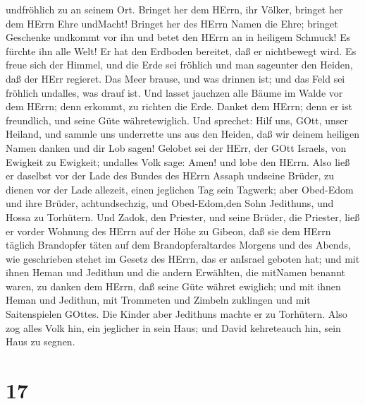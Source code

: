 undfröhlich zu an seinem Ort.  Bringet her dem HErrn, ihr
Völker, bringet her dem HErrn Ehre undMacht!  Bringet her
des HErrn Namen die Ehre; bringet Geschenke undkommt vor ihn und betet
den HErrn an in heiligem Schmuck!  Es fürchte ihn alle
Welt! Er hat den Erdboden bereitet, daß er nichtbewegt wird.
 Es freue sich der Himmel, und die Erde sei fröhlich und
man sageunter den Heiden, daß der HErr regieret.  Das Meer
brause, und was drinnen ist; und das Feld sei fröhlich undalles, was
drauf ist.  Und lasset jauchzen alle Bäume im Walde vor dem
HErrn; denn erkommt, zu richten die Erde.  Danket dem
HErrn; denn er ist freundlich, und seine Güte währetewiglich.
 Und sprechet: Hilf uns, GOtt, unser Heiland, und sammle
uns underrette uns aus den Heiden, daß wir deinem heiligen Namen danken
und dir Lob sagen!  Gelobet sei der HErr, der GOtt Israels,
von Ewigkeit zu Ewigkeit; undalles Volk sage: Amen! und lobe den HErrn.
 Also ließ er daselbst vor der Lade des Bundes des HErrn
Assaph undseine Brüder, zu dienen vor der Lade allezeit, einen jeglichen
Tag sein Tagwerk;  aber Obed-Edom und ihre Brüder,
achtundsechzig, und Obed-Edom,den Sohn Jedithuns, und Hossa zu
Torhütern.  Und Zadok, den Priester, und seine Brüder, die
Priester, ließ er vorder Wohnung des HErrn auf der Höhe zu Gibeon,
 daß sie dem HErrn täglich Brandopfer täten auf dem
Brandopferaltardes Morgens und des Abends, wie geschrieben stehet im
Gesetz des HErrn, das er anIsrael geboten hat;  und mit
ihnen Heman und Jedithun und die andern Erwählten, die mitNamen benannt
waren, zu danken dem HErrn, daß seine Güte währet ewiglich;
 und mit ihnen Heman und Jedithun, mit Trommeten und
Zimbeln zuklingen und mit Saitenspielen GOttes. Die Kinder aber
Jedithuns machte er zu Torhütern.  Also zog alles Volk hin,
ein jeglicher in sein Haus; und David kehreteauch hin, sein Haus zu
segnen.

\hypertarget{section-16}{%
\section{17}\label{section-16}}

